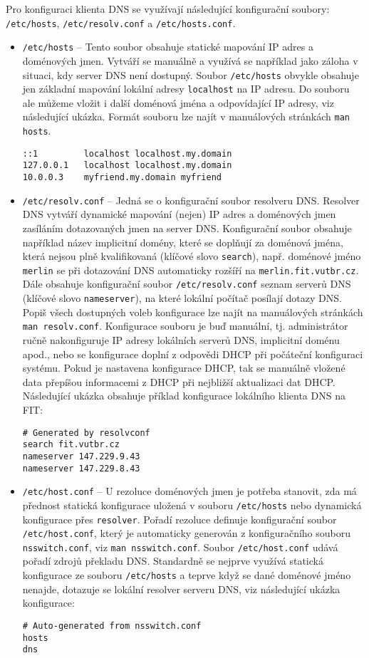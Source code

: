 Pro konfiguraci klienta DNS se využívají následující konfigurační soubory: {\tt /etc/hosts}, {\tt /etc/re\-solv.conf} a {\tt /etc/hosts.conf}. 
\begin{itemize}
  \item {\tt /etc/hosts} -- Tento soubor obsahuje statické mapování IP adres a doménových jmen. Vytváří se manuálně a využívá se například jako záloha v situaci, kdy server DNS není dostupný. Soubor {\tt /etc/hosts} obvykle obsahuje jen základní mapování lokální adresy {\tt localhost} na IP adresu. Do souboru ale můžeme vložit i další doménová jména a odpovídající IP adresy, viz následující ukázka. Formát souboru lze najít v manuálových stránkách {\tt man hosts}. 
\begin{verbatim}
::1         localhost localhost.my.domain
127.0.0.1   localhost localhost.my.domain
10.0.0.3    myfriend.my.domain myfriend
\end{verbatim}
  \item {\tt /etc/resolv.conf} -- Jedná se o konfigurační soubor resolveru DNS. Resolver DNS vytváří dynamické mapování (nejen) IP adres a doménových jmen zasíláním dotazovaných jmen na server DNS. Konfigurační soubor obsahuje například název implicitní domény, které se doplňují za doménová jména, která nejsou plně kvalifikovaná (klíčové slovo {\tt search}), např. doménové jméno {\tt merlin} se při dotazování DNS automaticky rozšíří na {\tt merlin.fit.vutbr.cz}. Dále obsahuje konfigurační soubor {\tt /etc/resolv.conf} seznam serverů DNS (klíčové slovo {\tt nameserver}), na které lokální počítač posílají dotazy DNS. Popiš všech dostupných voleb konfigurace lze najít na manuálových stránkách {\tt man resolv.conf}. Konfigurace souboru je buď manuální, tj. administrátor ručně nakonfiguruje IP adresy lokálních serverů DNS, implicitní doménu apod., nebo se konfigurace doplní z odpovědi DHCP při počáteční konfiguraci systému. Pokud je nastavena konfigurace DHCP, tak se manuálně vložené data přepíšou informacemi z DHCP při nejbližší aktualizaci dat DHCP. Následující ukázka obsahuje příklad konfigurace lokálního klienta DNS na FIT:
\begin{verbatim}
# Generated by resolvconf
search fit.vutbr.cz
nameserver 147.229.9.43
nameserver 147.229.8.43
\end{verbatim}
  \item {\tt /etc/host.conf} -- U rezoluce doménových jmen je potřeba stanovit, zda má přednost statická konfigurace uložená v souboru {\tt /etc/hosts} nebo dynamická konfigurace přes {\tt resolver}. Pořadí rezoluce definuje konfigurační soubor {\tt /etc/host.conf}, který je automaticky generován z konfiguračního souboru {\tt nsswitch.conf}, viz {\tt man nsswitch.conf}. Soubor {\tt /etc/host.conf} udává pořadí zdrojů překladu DNS. Standardně se nejprve využívá statická konfigurace ze souboru {\tt /etc/hosts} a teprve když se dané doménové jméno nenajde, dotazuje se lokální resolver serveru DNS, viz následující ukázka konfigurace:
\begin{verbatim}
# Auto-generated from nsswitch.conf
hosts
dns
\end{verbatim}
\end{itemize}

